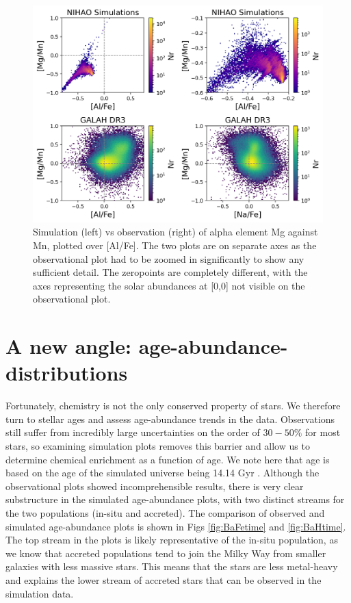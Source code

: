 \documentclass[fleqn,usenatbib]{mnras}
\begin{document}
\begin{figure}
	\includegraphics[width=\textwidth]{figures/mgmn_alfe.png}
    \caption{Simulation (left) vs observation (right) of alpha element Mg against Mn, plotted over [Al/Fe]. The two plots are on separate axes as the observational plot had to be zoomed in significantly to show any sufficient detail. The zeropoints are completely different, with the axes representing the solar abundances at [0,0] not visible on the observational plot.
    }
    \label{fig:NaFe_MgMn_selection_Age_FeH_dissection}
\end{figure}

\section{A new angle: age-abundance-distributions}\label{sec:Age-abundance}

Fortunately, chemistry is not the only conserved property of stars. We therefore turn to stellar ages and assess age-abundance trends in the data. Observations still suffer from incredibly large uncertainties on the order of $30-50\%$ for most stars, so examining simulation plots removes this barrier and allow us to determine chemical enrichment as a function of age. We note here that age is based on the age of the simulated universe being 14.14 Gyr \citep{Buck2021}. Although the observational plots showed incomprehensible results, there is very clear substructure in the simulated age-abundance plots, with two distinct streams for the two populations (in-situ and accreted). The comparison of observed and simulated age-abundance plots is shown in Figs \ref{fig:BaFetime} and \ref{fig:BaHtime}. The top stream in the plots is likely representative of the in-situ population, as we know that accreted populations tend to join the Milky Way from smaller galaxies with less massive stars. This means that the stars are less metal-heavy and explains the lower stream of accreted stars that can be observed in the simulation data. \par 
\end{document}
